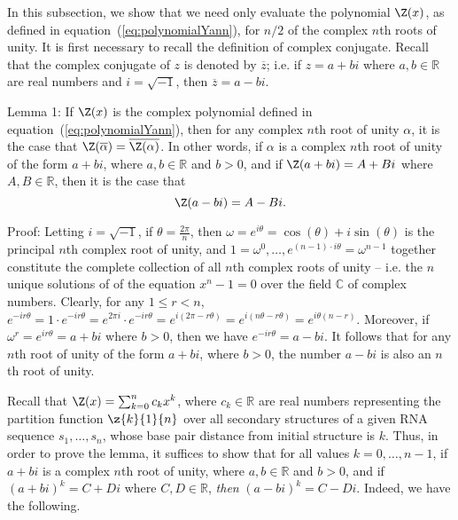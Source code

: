 In this subsection, we show that we need only evaluate the polynomial
$\Z(x)$, as defined in
equation~(\ref{eq:polynomialYann}), for $n/2$ of the complex $n$th roots
of unity. It is first necessary to recall the definition of complex
conjugate.
Recall that the complex conjugate of $z$ is denoted by $\overline{z}$;
i.e. if $z=a+bi$ where $a,b \in \mathbb{R}$ are real numbers and
$i = \sqrt{-1}$,  then $\overline{z} = a-bi$.
\smallskip

\noindent
{\sc Lemma 1:} If $\Z(x)$ is the complex polynomial defined in
equation~(\ref{eq:polynomialYann}), then for any complex $n$th root of
unity $\alpha$, it is the case that $\Z(\overline{\alpha}) =
\overline{\Z(\alpha)}$. In other words, if $\alpha$ is a complex $n$th root
of unity of the form $a+bi$, where $a,b \in \mathbb{R}$ and $b>0$, and
if $\Z(a+bi) = A + Bi$ where $A,B \in \mathbb{R}$, then it is the case that
\[
\Z(a - bi) = A - Bi.
\]
\smallskip

\noindent
{\sc Proof:}
Letting $i = \sqrt{-1}$, if  $\theta = \frac{2 \pi}{n}$, then
$\omega = e^{i \theta} = \cos(\theta) + i \sin(\theta)$
is the principal $n$th complex root of unity, and
$1=\omega^{0},\ldots,e^{(n-1)\cdot i \theta}=\omega^{n-1}$ together
constitute the complete collection of all
$n$th complex roots of unity -- i.e. the $n$ unique solutions of
of the equation $x^n -1 = 0$ over the field $\mathbb{C}$ of complex numbers.
Clearly, for any $1 \leq r < n$,
$e^{-i r \theta} = 1 \cdot e^{-i r \theta} =
e^{2 \pi i} \cdot e^{-i r \theta} = e^{i(2 \pi - r \theta)} =
e^{i(n \theta - r \theta)} = e^{i \theta (n - r)}$.
Moreover, if $\omega^r = e^{i r \theta} = a + b i$ where
$b>0$, then we have $e^{-i r \theta} = a-bi$. It follows that for any
$n$th root of unity of the form $a+bi$, where $b>0$, the number $a-bi$
is also an $n$th root of unity.

Recall that $\Z(x) = \sum_{k=0}^n c_k x^k$, where
$c_k\in \mathbb{R}$ are real numbers representing the partition function
$\z{k}{1}{n}$ over
all secondary structures of a given RNA sequence $s_1,\ldots,s_n$,
whose base pair distance from initial structure
\strSt is $k$. Thus, in order to prove the lemma, it suffices to show
that for all values $k=0,\ldots,n-1$, if $a+bi$ is a complex $n$th
root of unity, where $a,b \in \mathbb{R}$
and $b>0$, and if $(a+bi)^k = C+Di$ where $C,D \in \mathbb{R}$, {\em then}
$(a-bi)^k = C-Di$. Indeed, we have the following.

